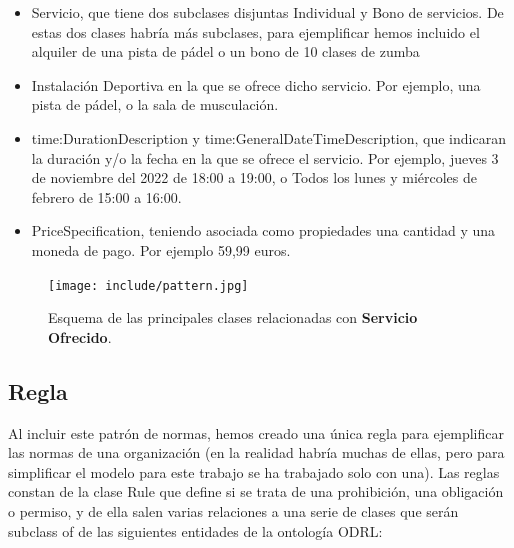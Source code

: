 \documentclass[a4paper,12pt]{article}
\begin{document}
	\begin{itemize}
		\item Servicio, que tiene dos subclases disjuntas Individual y Bono de servicios. De estas dos
	clases habría más subclases, para ejemplificar hemos incluido el alquiler de una pista de
	pádel o un bono de 10 clases de zumba
		\item Instalación Deportiva en la que se ofrece dicho servicio. Por ejemplo, una pista de pádel,
o la sala de musculación.
		\item time:DurationDescription y time:GeneralDateTimeDescription, que indicaran la
duración y/o la fecha en la que se ofrece el servicio. Por ejemplo, jueves 3 de noviembre	del 2022 de 18:00 a 19:00, o Todos los lunes y miércoles de febrero de 15:00 a 16:00.
		\item PriceSpecification, teniendo asociada como propiedades una cantidad y una moneda de
pago. Por ejemplo 59,99 euros.
	\end{itemize}
	
	\begin{figure}[H]
		\centering
		\texttt{[image: include/pattern.jpg]}
		\caption{Esquema de las principales clases relacionadas con \textbf{Servicio Ofrecido}.}
	\end{figure}
	
	\subsection{Regla}
	
	Al incluir este patrón de normas, hemos creado una única regla para ejemplificar las normas de
	una organización (en la realidad habría muchas de ellas, pero para simplificar el modelo para este
	trabajo se ha trabajado solo con una). Las reglas constan de la clase Rule que define si se trata de
	una prohibición, una obligación o permiso, y de ella salen varias relaciones a una serie de clases
	que serán subclass of de las siguientes entidades de la ontología ODRL:
	
\end{document}
